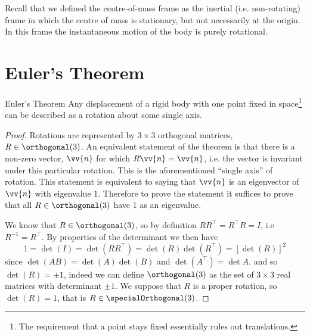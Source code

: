 \documentclass[fleqn]{NotesClass}
\newcommand*{\ident}{I}
\newcommand*{\trans}{\top}
\begin{document}
    Recall that we defined the centre-of-mass frame as the inertial (i.e. non-rotating) frame in which the centre of mass is stationary, but not necessarily at the origin.
    In this frame the instantaneous motion of the body is purely rotational.
    
    \section{Euler's Theorem}
    \begin{thm}{Euler's Theorem}{}
        Any displacement of a rigid body with one point fixed in space\footnote{The requirement that a point stays fixed essentially rules out translations.} can be described as a rotation about some single axis.
        \begin{proof}
            Rotations are represented by \(3\times 3\) orthogonal matrices, \(R \in \orthogonal(3)\).
            An equivalent statement of the theorem is that there is a non-zero vector, \(\vv{n}\) for which \(R\vv{n} = \vv{n}\), i.e. the vector is invariant under this particular rotation.
            This is the aforementioned \enquote{single axis} of rotation.
            This statement is equivalent to saying that \(\vv{n}\) is an eigenvector of \(\vv{n}\) with eigenvalue \(1\).
            Therefore to prove the statement it suffices to prove that all \(R\in\orthogonal(3)\) have 1 as an eigenvalue.
            
            We know that \(R \in \orthogonal(3)\), so by definition \(RR^{\trans} = R^{\trans}R = \ident\), i.e \(R^{-1} = R^{\trans}\).
            By properties of the determinant we then have
            \begin{equation}
                1 = \det(\ident) = \det(RR^\trans) = \det(R)\det(R^\trans) = [\det(R)]^2
            \end{equation}
            since \(\det(AB) = \det(A)\det(B)\) and \(\det(A^\trans) = \det A\).
            and so \(\det(R) = \pm 1\), indeed we can define \(\orthogonal(3)\) as the set of \(3\times 3\) real matrices with determinant \(\pm 1\).
            We suppose that \(R\) is a proper rotation, so \(\det(R) = 1\), that is \(R \in \specialOrthogonal(3)\).
            

\end{proof}
\end{thm}
\end{document}
